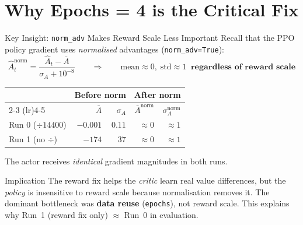 \documentclass[aspectratio=169,11pt]{beamer}
\begin{document}
\section{Why Epochs = 4 is the Critical Fix}

\begin{frame}{Key Insight: \texttt{norm\_adv} Makes Reward Scale Less Important}
  \small
  Recall that the PPO policy gradient uses \emph{normalised} advantages (\texttt{norm\_adv=True}):
  \[
    \hat{A}_t^\text{norm} = \frac{\hat{A}_t - \bar{A}}{\sigma_A + 10^{-8}}
    \qquad\Longrightarrow\qquad
    \text{mean} \approx 0,\; \text{std} \approx 1 \;\;\textbf{regardless of reward scale}
  \]

  \medskip
  \begin{center}
  \footnotesize
  \begin{tabular}{lrrrr}
    \toprule
    & \multicolumn{2}{c}{\textbf{Before norm}} & \multicolumn{2}{c}{\textbf{After norm}} \\
    \cmidrule(lr){2-3} \cmidrule(lr){4-5}
    & $\bar{A}$ & $\sigma_A$ & $\bar{A}^\text{norm}$ & $\sigma_A^\text{norm}$ \\
    \midrule
    Run 0 ($\div 14400$) & $-0.001$ & $0.11$ & $\approx 0$ & $\approx 1$ \\
    Run 1 (no $\div$)    & $-174$   & $37$   & $\approx 0$ & $\approx 1$ \\
    \bottomrule
  \end{tabular}
  \end{center}

  \medskip
  \alert{The actor receives \emph{identical} gradient magnitudes in both runs.}

  \bigskip
  \begin{block}{Implication}
    The reward fix helps the \emph{critic} learn real value differences, but the
    \emph{policy} is insensitive to reward scale because normalisation removes it.
    The dominant bottleneck was \textbf{data reuse} (\texttt{epochs}), not reward scale.
    This explains why Run~1 (reward fix only) $\approx$ Run~0 in evaluation.
  \end{block}
\end{frame}
\end{document}
